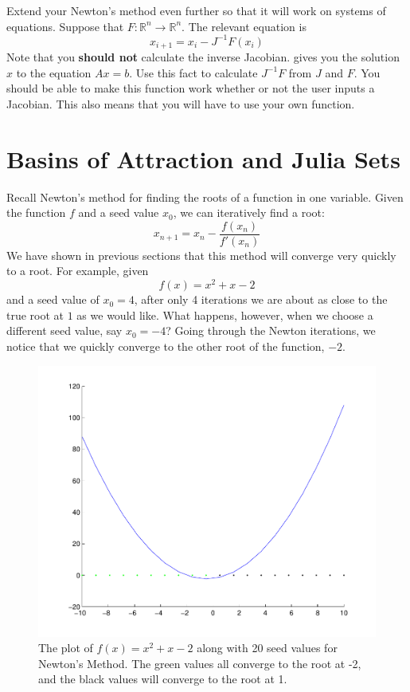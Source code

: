 \begin{problem}
Extend your Newton's method even further so that it will work on systems of equations. Suppose that $F: \mathbb{R}^n \rightarrow \mathbb{R}^n $. The relevant equation is
\[
x_{i+1} = x_i - J^{-1}F(x_i)
\]
Note that you {\bf should not} calculate the inverse Jacobian.  gives you the solution $x$ to the equation $Ax=b$. Use this fact to calculate $J^{-1}F$ from $J$ and $F$.  You should be able to make this function work whether or not the user inputs a Jacobian. This also means that you will have to use your own  function.
\end{problem}

\section*{Basins of Attraction and Julia Sets}
Recall Newton's method for finding the roots of a function in one variable.  Given the function $f$ and a seed value $x_0$, we can iteratively find a root:
\[
x_{n+1} = x_n - \frac{f(x_n)}{f'(x_n)}
\]
We have shown in previous sections that this method will converge very quickly to a root.  For example, given
\[
f(x) = x^2 + x -2
\]
and a seed value of $x_0 = 4$, after only 4 iterations we are about as close to the true root at $1$ as we would like.  What happens, however, when we choose a different seed value, say $x_0 = -4$?  Going through the Newton iterations, we notice that we quickly converge to the other root of the function, $-2$.

\begin{figure}
\begin{center}
\includegraphics[scale=0.5]{basins1}
\caption{The plot of $f(x) = x^2 + x - 2$ along with 20 seed values for Newton's Method.  The green values all converge to the root at -2, and the black values will converge to the root at 1.}
\label{Fig:basins1}
\end{center}
\end{figure}

